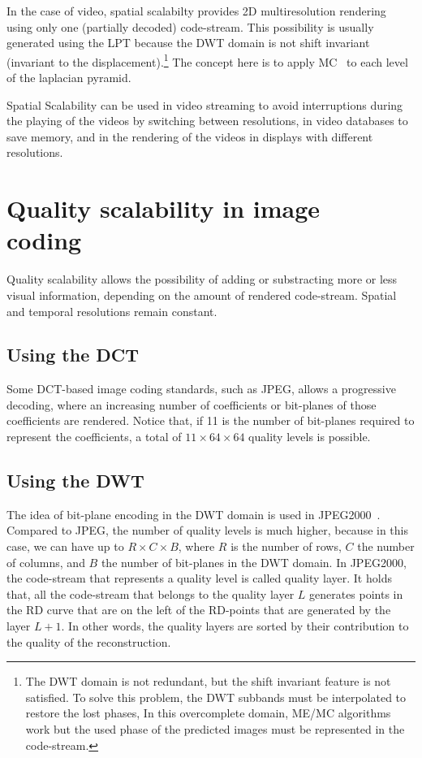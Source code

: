 
In the case of video, spatial scalabilty provides 2D multiresolution
rendering using only one (partially decoded) code-stream. This
possibility is usually generated using the LPT because the DWT domain
is not shift invariant (invariant to the displacement).\footnote{The
DWT domain is not redundant, but the shift invariant feature is not
satisfied. To solve this problem, the DWT subbands must be
interpolated to restore the lost phases, In this overcomplete domain,
ME/MC algorithms work but the used phase of the predicted images must
be represented in the code-stream.} The concept here is to apply
MC~\cite{vruiz__MC} to each level of the laplacian pyramid.

Spatial Scalability can be used in video streaming to avoid
interruptions during the playing of the videos by switching between
resolutions, in video databases to save memory, and in the rendering
of the videos in displays with different resolutions.


\section{Quality scalability in image coding~\cite{vruiz__JPEG2000}}


Quality scalability allows the possibility of adding or substracting
more or less visual information, depending on the amount of rendered
code-stream. Spatial and temporal resolutions remain constant.

\subsection{Using the DCT}

Some DCT-based image coding standards, such as JPEG, allows a
progressive decoding, where an increasing number of coefficients or
bit-planes of those coefficients are rendered. Notice that, if 11 is
the number of bit-planes required to represent the coefficients, a
total of $11\times 64\times 64$ quality levels is possible.

\subsection{Using the DWT~\cite{vruiz__transform_coding}}

The idea of bit-plane encoding in the DWT domain is used in
JPEG2000~\cite{vruiz__JPEG2000}. Compared to JPEG, the number of
quality levels is much higher, because in this case, we can have up to
$R\times C\times B$, where $R$ is the number of rows, $C$ the number
of columns, and $B$ the number of bit-planes in the DWT domain. In
JPEG2000, the code-stream that represents a quality level is called
quality layer. It holds that, all the code-stream that belongs to the
quality layer $L$ generates points in the RD curve that are on the
left of the RD-points that are generated by the layer $L+1$. In other
words, the quality layers are sorted by their contribution to the
quality of the reconstruction.

